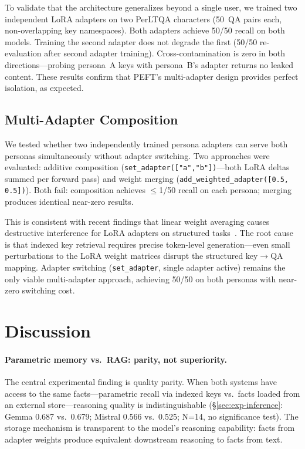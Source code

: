\documentclass[11pt]{article}
\begin{document}
To validate that the architecture generalizes beyond a single user, we trained two independent LoRA adapters on two PerLTQA characters (50~QA pairs each, non-overlapping key namespaces).
Both adapters achieve 50/50 recall on both models.
Training the second adapter does not degrade the first (50/50 re-evaluation after second adapter training).
Cross-contamination is zero in both directions---probing persona~A keys with persona~B's adapter returns no leaked content.
These results confirm that PEFT's multi-adapter design provides perfect isolation, as expected.

\subsection{Multi-Adapter Composition}
\label{sec:exp-composition}

We tested whether two independently trained persona adapters can serve both personas simultaneously without adapter switching.
Two approaches were evaluated: additive composition (\texttt{set\_adapter(["a","b"])}---both LoRA deltas summed per forward pass) and weight merging (\texttt{add\_weighted\_adapter([0.5, 0.5])}).
Both fail: composition achieves $\leq$1/50 recall on each persona; merging produces identical near-zero results.

This is consistent with recent findings that linear weight averaging causes destructive interference for LoRA adapters on structured tasks~\citep{zhang2025unraveling, back2026understanding}.
The root cause is that indexed key retrieval requires precise token-level generation---even small perturbations to the LoRA weight matrices disrupt the structured key$\rightarrow$QA mapping.
Adapter switching (\texttt{set\_adapter}, single adapter active) remains the only viable multi-adapter approach, achieving 50/50 on both personas with near-zero switching cost.

\section{Discussion}
\label{sec:discussion}

\paragraph{Parametric memory vs.\ RAG: parity, not superiority.}
The central experimental finding is quality parity.
When both systems have access to the same facts---parametric recall via indexed keys vs.\ facts loaded from an external store---reasoning quality is indistinguishable (\S\ref{sec:exp-inference}: Gemma 0.687 vs.\ 0.679; Mistral 0.566 vs.\ 0.525; N=14, no significance test).
The storage mechanism is transparent to the model's reasoning capability: facts from adapter weights produce equivalent downstream reasoning to facts from text.
\end{document}
